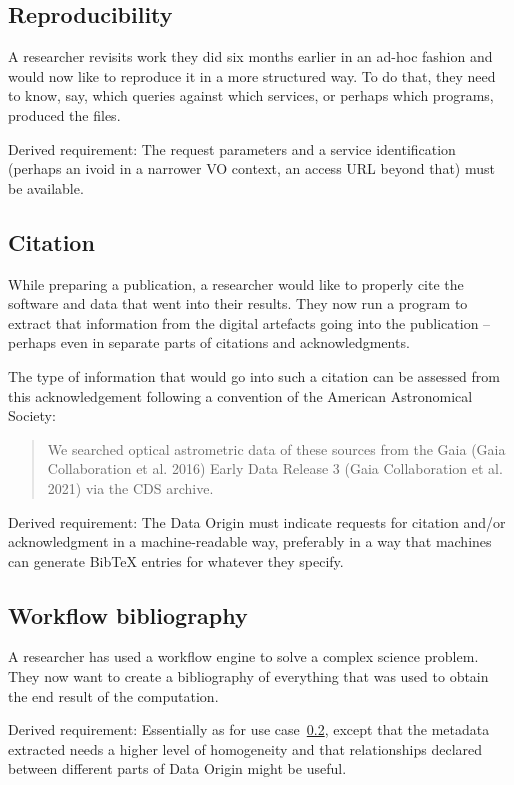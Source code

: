 \documentclass[11pt,a4paper]{ivoa}
\begin{document}
\subsection{Reproducibility}

A researcher revisits work they did six months earlier in an ad-hoc fashion and would now like to reproduce it in a more structured way. To do that, they need to know, say, which queries against which services, or perhaps which programs, produced the files.

Derived requirement: The request parameters and a service identification
(perhaps an ivoid in a narrower VO context, an access URL beyond that) must be available.

\subsection{Citation}
\label{sec:req-citation}

While preparing a publication, a researcher would like to properly cite the software and data that went into their results. They now run a program to extract that information from the digital artefacts going into the publication -- perhaps even in separate parts of citations and acknowledgments.

The type of information that would go into such a
citation can be assessed from this acknowledgement following a
convention of the American Astronomical Society:

\begin{quotation}
We searched optical astrometric data of these sources from the Gaia (Gaia Collaboration et al. 2016) Early Data Release 3 (Gaia Collaboration et al. 2021) via the CDS archive.
\end{quotation}

Derived requirement: The Data Origin must indicate requests for citation
and/or acknowledgment in a machine-readable way, preferably in a way
that machines can generate BibTeX entries for whatever they specify.


\subsection{Workflow bibliography}

A researcher has used a workflow engine to solve a complex science
problem.  They now want to create a bibliography of everything that was
used to obtain the end result of the computation.

Derived requirement: Essentially as for use case~\ref{sec:req-citation},
except that the metadata extracted needs a higher level of homogeneity
and that relationships declared between different parts of Data Origin
might be useful.
\end{document}
